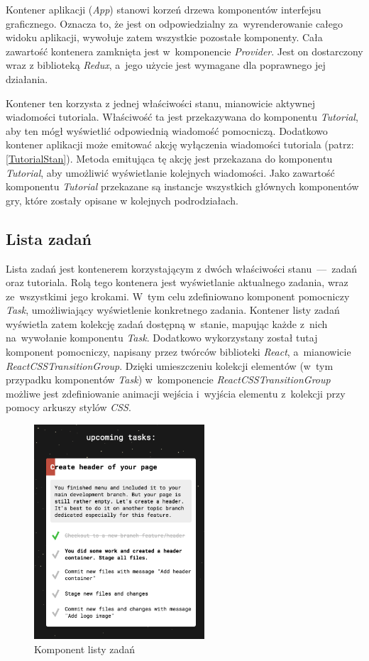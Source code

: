 \documentclass[12pt,a4paper,polish,thesis]{dcsbook}
\begin{document}
{	Kontener aplikacji (\textit{App}) stanowi korzeń drzewa komponentów interfejsu graficznego. Oznacza to, że jest on odpowiedzialny za~wyrenderowanie całego widoku aplikacji, wywołuje zatem wszystkie pozostałe komponenty. Cała zawartość kontenera zamknięta jest w~komponencie \textit{Provider}. Jest on dostarczony wraz z biblioteką \textit{Redux}, a~jego użycie jest wymagane dla poprawnego jej działania.

	Kontener ten korzysta z jednej właściwości stanu, mianowicie aktywnej wiadomości tutoriala. Właściwość ta jest przekazywana do komponentu \textit{Tutorial}, aby ten mógł wyświetlić odpowiednią wiadomość pomocniczą. Dodatkowo kontener aplikacji może emitować akcję wyłączenia wiadomości tutoriala (patrz: \ref{TutorialStan}). Metoda emitująca tę akcję jest przekazana do komponentu \textit{Tutorial}, aby umożliwić wyświetlanie kolejnych wiadomości. Jako zawartość komponentu \textit{Tutorial} przekazane są instancje wszystkich głównych komponentów gry, które zostały opisane w kolejnych podrodziałach.

	\subsection{Lista zadań}

	Lista zadań jest kontenerem korzystającym z dwóch właściwości stanu~---~zadań oraz tutoriala. Rolą tego kontenera jest wyświetlanie aktualnego zadania, wraz ze~wszystkimi jego krokami. W~tym celu zdefiniowano komponent pomocniczy \textit{Task}, umożliwiający wyświetlenie konkretnego zadania. Kontener listy zadań wyświetla zatem kolekcję zadań dostępną w~stanie, mapując każde z~nich na~wywołanie komponentu \textit{Task}. Dodatkowo wykorzystany został tutaj komponent pomocniczy, napisany przez twórców biblioteki \textit{React}, a~mianowicie \textit{ReactCSSTransitionGroup}. Dzięki umieszczeniu kolekcji elementów (w~tym przypadku komponentów \textit{Task}) w~komponencie \textit{ReactCSSTransitionGroup} możliwe jest zdefiniowanie animacji wejścia i~wyjścia elementu z~kolekcji przy pomocy arkuszy stylów \textit{CSS}.

	\begin{figure}[h]
		\centering
		\includegraphics[height=8cm]{component-task-list}
		\caption{Komponent listy zadań}
		\label{fig:task-list}
	\end{figure}

}
\end{document}
